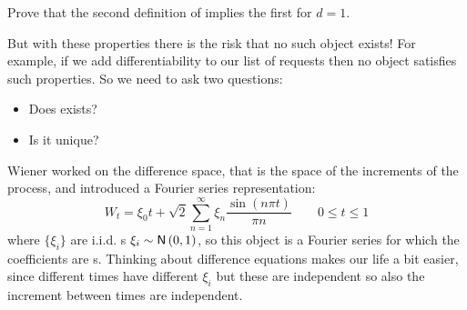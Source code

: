 \documentclass{report}
\begin{document}
\begin{exercise}
	Prove that the second definition of \bwm{} implies the first for $d=1$.
\end{exercise}
But with these properties there is the risk that no such object exists! For example, if we add differentiability to our list of requests then no object satisfies such properties. So we need to ask two questions:
\begin{itemize}
	\item Does \bwm{} exists?
	\item Is it unique?
\end{itemize}
Wiener worked on the difference space, that is the space of the increments of the process, and introduced a Fourier series representation:
\begin{equation*}
	W_t=\xi_{0}t+\sqrt{2}\sum_{n=1}^{\infty}\xi_{n}\frac{\sin(n\pi t)}{\pi n}\qquad0\leq t\leq 1
\end{equation*}
where $\{\xi_{i}\}$ are i.i.d. \rv s $\xi_{i}\sim\mathsf{N}\left(0,1\right)$, so this object is a Fourier series for which the coefficients are \rv s. Thinking about difference equations makes our life a bit easier, since different times have different $\xi_{i}$ but these are independent so also the increment between times are independent.
\end{document}

